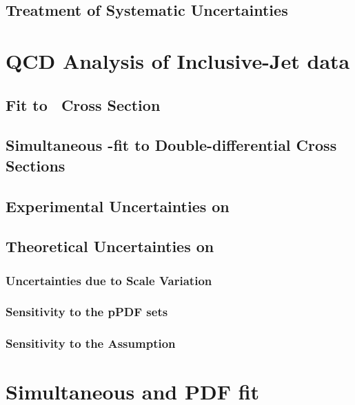 \subsection{Treatment of Systematic Uncertainties}
\label{subsec:sysunctreatment}


\section{QCD Analysis of Inclusive-Jet data}
\label{sec:asfit}


\subsection{Fit to \dsdetjetb~Cross Section}
\label{subsec:singledifasfit}


\subsection{Simultaneous \asz-fit to Double-differential Cross Sections}
\label{subsec:doubledifasfit}


\subsection{Experimental Uncertainties on \asz}
\label{subsec:asexpunc}

\subsection{Theoretical Uncertainties on \asz}
\label{subsec:asthunc}
% 

\subsubsection{Uncertainties due to Scale Variation}
\label{subsec:asscalevar}

\subsubsection{Sensitivity to the pPDF sets}
\label{subsec:aspdfassump}

\subsubsection{Sensitivity to the \asz Assumption}
\label{subsec:asassump}

\section{Simultaneous \asz and PDF fit}
\label{sec:aspdffit}